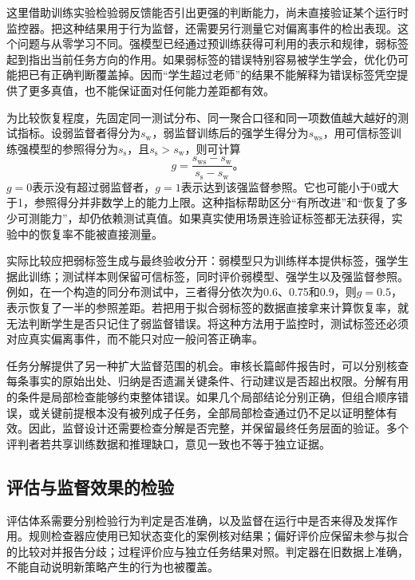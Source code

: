 这里借助训练实验检验弱反馈能否引出更强的判断能力，尚未直接验证某个运行时监控器。把这种结果用于行为监督，还需要另行测量它对偏离事件的检出表现。这个问题与从零学习不同。强模型已经通过预训练获得可利用的表示和规律，弱标签起到指出当前任务方向的作用。如果弱标签的错误特别容易被学生学会，优化仍可能把已有正确判断覆盖掉。因而“学生超过老师”的结果不能解释为错误标签凭空提供了更多真值，也不能保证面对任何能力差距都有效。

为比较恢复程度，先固定同一测试分布、同一聚合口径和同一项数值越大越好的测试指标。设弱监督者得分为$s_{\mathrm{w}}$，弱监督训练后的强学生得分为$s_{\mathrm{ws}}$，用可信标签训练强模型的参照得分为$s_{\mathrm{s}}$，且$s_{\mathrm{s}}>s_{\mathrm{w}}$，则可计算
\begin{equation}
 g=\frac{s_{\mathrm{ws}}-s_{\mathrm{w}}}
          {s_{\mathrm{s}}-s_{\mathrm{w}}}\text{。}
 \label{eq:alignment-weak-strong-recovery}
\end{equation}
$g=0$表示没有超过弱监督者，$g=1$表示达到该强监督参照。它也可能小于0或大于1，参照得分并非数学上的能力上限。这种指标帮助区分“有所改进”和“恢复了多少可测能力”，却仍依赖测试真值。如果真实使用场景连验证标签都无法获得，实验中的恢复率不能被直接测量。

实际比较应把弱标签生成与最终验收分开：弱模型只为训练样本提供标签，强学生据此训练；测试样本则保留可信标签，同时评价弱模型、强学生以及强监督参照。例如，在一个构造的同分布测试中，三者得分依次为0.6、0.75和0.9，则$g=0.5$，表示恢复了一半的参照差距。若把用于拟合弱标签的数据直接拿来计算恢复率，就无法判断学生是否只记住了弱监督错误。将这种方法用于监控时，测试标签还必须对应真实偏离事件，而不能只对应一般问答正确率。

任务分解提供了另一种扩大监督范围的机会。审核长篇邮件报告时，可以分别核查每条事实的原始出处、归纳是否遗漏关键条件、行动建议是否超出权限。分解有用的条件是局部检查能够约束整体错误。如果几个局部结论分别正确，但组合顺序错误，或关键前提根本没有被列成子任务，全部局部检查通过仍不足以证明整体有效。因此，监督设计还需要检查分解是否完整，并保留最终任务层面的验证。多个评判者若共享训练数据和推理缺口，意见一致也不等于独立证据。

\subsection{评估与监督效果的检验}
\label{sec:alignment-oversight-validation}

评估体系需要分别检验行为判定是否准确，以及监督在运行中是否来得及发挥作用。规则检查器应使用已知状态变化的案例核对结果；偏好评价应保留未参与拟合的比较对并报告分歧；过程评价应与独立任务结果对照。判定器在旧数据上准确，不能自动说明新策略产生的行为也被覆盖。

